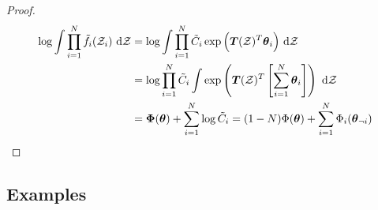 \begin{proof}
    \begin{equation*}
    \begin{aligned}
        \log \int \prod^N_{i=1}\tilde{f}_i(\mathcal{Z}_i)\ \mathrm{d}\mathcal{Z} &= \log \int \prod^N_{i=1}\tilde{C}_i\exp\Big( \boldsymbol T(\mathcal{Z})^T\boldsymbol \theta_i \Big)\ \mathrm{d}\mathcal{Z} \\
        &= \log \prod^N_{i=1}\tilde{C}_i \int \exp\left( \boldsymbol T(\mathcal{Z})^T\left[ \sum^N_{i=1}\boldsymbol \theta_i  \right] \right)\ \mathrm{d}\mathcal{Z} \\
        &=\boldsymbol \Phi(\boldsymbol \theta) + \sum^N_{i=1} \log \tilde{C}_i  = (1- N)\Phi(\boldsymbol \theta) + \sum_{i=1}^N \Phi_i(\boldsymbol \theta_{\neg i})
    \end{aligned}
    \end{equation*}
\end{proof}

\subsection{Examples}

